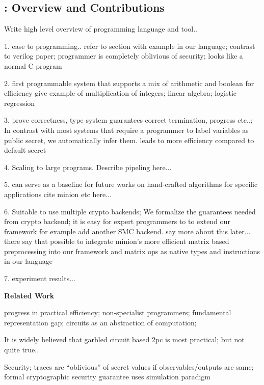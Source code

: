 \subsection{\tool: Overview and Contributions} Write high level overview of programming language and tool..

1. ease to programming.. refer to section with example in our language; contrast to verilog paper; programmer is completely oblivious of security; looks like a normal C program

2. first programmable system that supports a mix of arithmetic and boolean for efficiency give example of multiplication of integers; linear algebra; logistic regression

3. prove correctness, type system guarantees correct termination, progress etc..; In contrast with most systems that require a programmer to label variables as public secret, we automatically infer them. leads to more efficiency compared to default secret

4. Scaling to large programs. Describe pipeling here...

5. can serve as a baseline for future works on hand-crafted algorithms for specific applications cite minion etc here...

6. Suitable to use multiple crypto backends; We formalize the guarantees needed from crypto backend; it is easy for expert programmers to to extend our framework for example add another SMC backend. say more about this later... there say that possible to integrate minion's more efficient matrix based preprocessing into our framework and matrix ops as native types and instructions in our language

7. experiment results...



\noindent\textbf{Related Work}
\cite{lambdaps,wysteria}

 progress in practical efficiency; non-specialist programmers; fundamental representation gap; circuits as an abstraction of computation; 

 It is widely believed that garbled circuit based 2pc is most practical; but not quite true..

 Security; traces are ``oblivious'' of secret values if observables/outputs are same; formal cryptographic security guarantee uses simulation paradigm \cite{canetti2000} 


